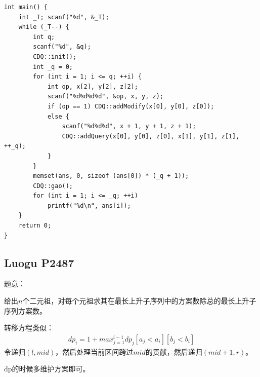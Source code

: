 \begin{lstlisting}
int main() {
	int _T; scanf("%d", &_T);
	while (_T--) {
		int q;
		scanf("%d", &q);
		CDQ::init();	
		int _q = 0;
		for (int i = 1; i <= q; ++i) {
			int op, x[2], y[2], z[2];
			scanf("%d%d%d%d", &op, x, y, z);
			if (op == 1) CDQ::addModify(x[0], y[0], z[0]);
			else {
			   	scanf("%d%d%d", x + 1, y + 1, z + 1);
				CDQ::addQuery(x[0], y[0], z[0], x[1], y[1], z[1], ++_q);
			}
		}
		memset(ans, 0, sizeof (ans[0]) * (_q + 1));
		CDQ::gao();
		for (int i = 1; i <= _q; ++i)
			printf("%d\n", ans[i]);
	}
	return 0;
}
\end{lstlisting}

\subsection{Luogu P2487}

题意：\par
给出$n$个二元祖，对每个元祖求其在最长上升子序列中的方案数除总的最长上升子序列方案数。\par

转移方程类似：
\begin{eqnarray*}
dp_i = 1 + max_{j = 1}^{i - 1} dp_j[a_j < a_i][b_j < b_i]
\end{eqnarray*}
令递归$(l, mid)$，然后处理当前区间跨过$mid$的贡献，然后递归$(mid + 1, r)$。\par
dp的时候多维护方案即可。

